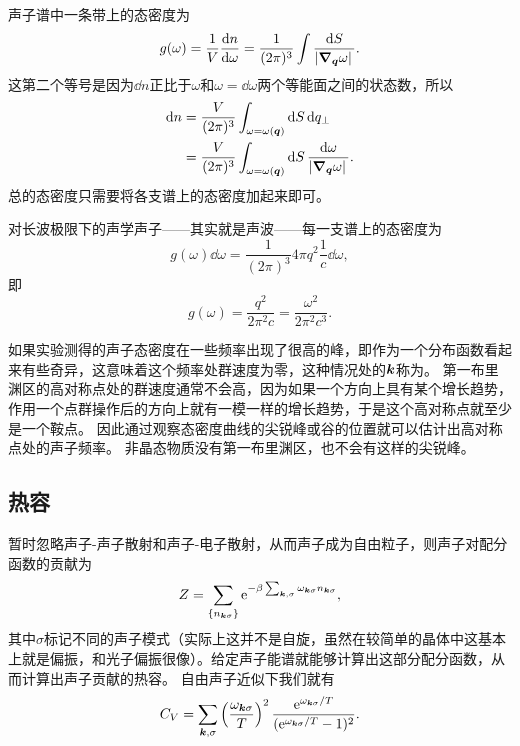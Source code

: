 声子谱中一条带上的态密度为
\begin{equation}
    g(\omega) = \frac{1}{V} \dv{n}{\omega} = \frac{1}{(2\pi)^3} \int \frac{\dd{S}}{\abs*{\grad_{\vb*{q}} \omega}}.
\end{equation}
这第二个等号是因为$\dd{n}$正比于$\omega$和$\omega = \dd{\omega}$两个等能面之间的状态数，所以
\[
    \begin{aligned}
        \dd{n} &= \frac{V}{(2\pi)^3} \int_{\omega=\omega(\vb*{q})} \dd{S} \dd{q_\bot} \\
        &= \frac{V}{(2\pi)^3} \int_{\omega=\omega(\vb*{q})} \dd{S} \frac{\dd{\omega}}{\abs*{\grad_{\vb*{q}} \omega}}.
    \end{aligned}
\]
总的态密度只需要将各支谱上的态密度加起来即可。

对长波极限下的声学声子——其实就是声波——每一支谱上的态密度为
\[
    g(\omega) \dd{\omega} = \frac{1}{(2\pi)^3} 4\pi q^2 \frac{1}{c} \dd{\omega},
\]
即
\begin{equation}
    g(\omega) = \frac{q^2}{2\pi^2 c} = \frac{\omega^2}{2\pi^2 c^3}.
    \label{eq:linear-phonon-state-density}
\end{equation}

如果实验测得的声子态密度在一些频率出现了很高的峰，即作为一个分布函数看起来有些奇异，这意味着这个频率处群速度为零，这种情况处的$\vb*{k}$称为。
第一布里渊区的高对称点处的群速度通常不会高，因为如果一个方向上具有某个增长趋势，作用一个点群操作后的方向上就有一模一样的增长趋势，于是这个高对称点就至少是一个鞍点。
因此通过观察态密度曲线的尖锐峰或谷的位置就可以估计出高对称点处的声子频率。
非晶态物质没有第一布里渊区，也不会有这样的尖锐峰。

\subsection{热容}\label{sec:lattice-special-heat}

暂时忽略声子-声子散射和声子-电子散射，从而声子成为自由粒子，则声子对配分函数的贡献为
\begin{equation}
    Z = \sum_{\{n_{\vb*{k} \sigma}\}} \mathrm{e}^{-\beta \sum_{\vb*{k}, \sigma} \omega_{\vb*{k} \sigma} n_{\vb*{k} \sigma}},
\end{equation}
其中$\sigma$标记不同的声子模式（实际上这并不是自旋，虽然在较简单的晶体中这基本上就是偏振，和光子偏振很像）。给定声子能谱就能够计算出这部分配分函数，从而计算出声子贡献的热容。
自由声子近似下我们就有
\begin{equation}
    C_V = \sum_{\vb*{k}, \sigma} \left(\frac{\omega_{\vb*{k}\sigma}}{T}\right)^2 \frac{\mathrm{e}^{\omega_{\vb*{k}\sigma} / T}}{(\mathrm{e}^{\omega_{\vb*{k}\sigma} / T} - 1)^2}.
    \label{eq:free-phonon-special-heat}
\end{equation}

